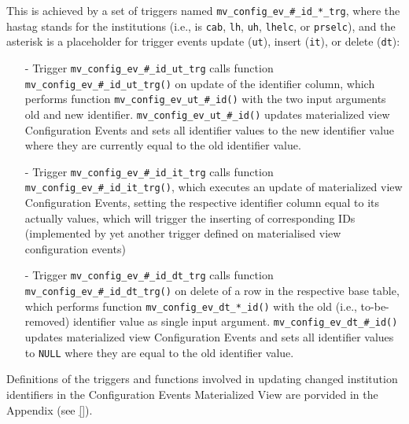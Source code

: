 This is achieved by a set of triggers named \texttt{mv\_config\_ev\_\#\_id\_*\_trg}, where the hastag stands for the institutions (i.e., is \texttt{cab}, \texttt{lh}, \texttt{uh}, \texttt{lhelc}, or \texttt{prselc}), and the asterisk is a placeholder for trigger events update (\texttt{ut}), insert (\texttt{it}), or delete (\texttt{dt}):
\begin{itemize}
\item[-]Trigger \texttt{mv\_config\_ev\_\#\_id\_ut\_trg} calls function \texttt{mv\_config\_ev\_\#\_id\_ut\_trg()} on update of the identifier column, which performs function \texttt{mv\_config\_ev\_ut\_\#\_id()} with the two input arguments old and new identifier.
\texttt{mv\_config\_ev\_ut\_\#\_id()} updates materialized view Configuration Events and sets all identifier values to the new identifier value where they are currently equal to the old identifier value.

\item[-]Trigger \texttt{mv\_config\_ev\_\#\_id\_it\_trg} calls function \texttt{mv\_config\_ev\_\#\_id\_it\_trg()}, which executes an update of materialized view Configuration Events, setting the respective identifier column equal to its actually values, which will trigger the inserting of corresponding IDs (implemented by yet another trigger defined on materialised view configuration events)

\item[-]Trigger \texttt{mv\_config\_ev\_\#\_id\_dt\_trg} calls function \texttt{mv\_config\_ev\_\#\_id\_dt\_trg()} on delete of a row in the respective base table, which performs function \texttt{mv\_config\_ev\_dt\_*\_id()} with the old (i.e., to-be-removed) identifier value as single input argument.
\texttt{mv\_config\_ev\_dt\_\#\_id()} updates materialized view Configuration Events and sets all identifier values to \texttt{NULL} where they are equal to the old identifier value.
\end{itemize}

Definitions of the triggers and functions involved in updating changed institution identifiers in the Configuration Events Materialized View are porvided in the Appendix (see \ref{}).